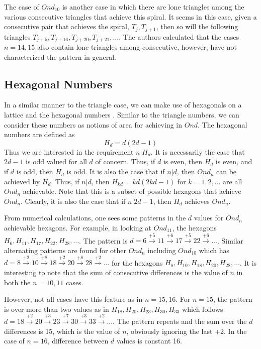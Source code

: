 \documentclass[11pt,reqno]{amsart}
\theoremstyle{mydef}
\begin{document}
The case of $Ond_{10}$ is another case in which there are lone triangles among the various consecutive triangles
that achieve this spiral. It seems in this case, given a consecutive pair that achieves the spiral, $T_{j}, T_{j+1}$, then
so will the following triangles $T_{j+5}, T_{j+16}, T_{j+20}, T_{j+21}, \ldots$. The authors  calculated that the cases
$n = 14, 15$ also contain lone triangles among consecutive, however, have not characterized the pattern in general.

\subsection{Hexagonal Numbers}

In a similar manner to the triangle case, we can make use of hexagonals on a lattice and 
the hexagonal numbers  \cite{HexagonalNumbers}. Similar to the triangle numbers, we
can consider these numbers as notions of area for achieving in $Ond$. The hexagonal numbers are
defined as 
\[
	H_d = d(2d - 1)
\]
Thus we are interested in the requirement $n \vert H_d$. It is necessarily the case that $2d - 1$ is 
odd valued for all $d$ of concern. Thus, if $d$ is even, then $H_d$ is even, and if $d$ is odd, then
$H_d$ is odd. It is also the case that if $n \vert d$, then $Ond_n$ can be achieved by $H_d$. Thus,
if $n \vert d$, then $H_{kd} = kd(2kd - 1)$ for $k = 1, 2, \ldots$ are all $Ond_n$ achievable. Note that 
this is a subset of possible hexagons that achieve $Ond_n$. Clearly, it is also the case that if $n \vert
2d - 1$, then $H_d$ achieves $Ond_n$. 

From numerical calculations, one sees some patterns in the $d$ values for $Ond_n$ achievable
hexagons. For example, in looking at $Ond_{11}$, the hexagons $H_{6}, H_{11}, H_{17}, H_{22}, H_{28}, \ldots$.
The pattern is $d = 6 \xrightarrow{+5} 11 \xrightarrow{+6} 17 \xrightarrow{+5} 22 \xrightarrow{+6} \ldots$.
Similar alternating patterns are found for other $Ond_n$ including $Ond_{10}$ which has 
$d = 8 \xrightarrow{+2} 10 \xrightarrow{+8} 18 \xrightarrow{+2} 20 \xrightarrow{+8}  28 \xrightarrow{+2} \ldots$ for the hexagons
$H_{8}, H_{10}, H_{18}, H_{20}, H_{28}, \ldots$. It is interesting to note that the sum of consecutive differences
is the value of $n$ in both the $n = 10, 11$ cases.

However, not all cases have this feature as in $n = 15, 16$. For $n = 15$, the pattern is over more
than two values  as in $H_{18}, H_{20}, H_{23}, H_{30}, H_{33}$ which follows 
$d = 18 \xrightarrow{+2} 20 \xrightarrow{+3} 23 \xrightarrow{+7} 30 \xrightarrow{+3} 33 \xrightarrow{+2} \ldots$. The pattern repeats and the sum
over the $d$ differences is 15, which is the value of $n$, obviously ignoring the last +2. In the case of $n = 16$, difference between $d$ values is constant 16.
\end{document}
